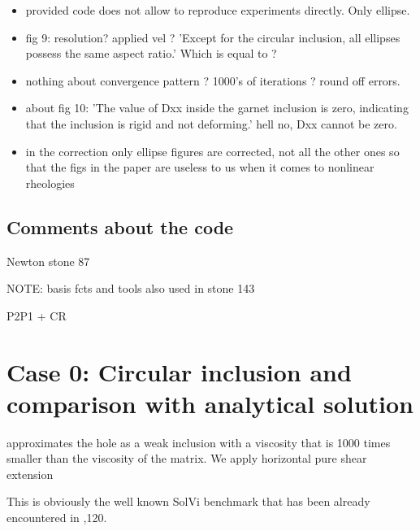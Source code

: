 \begin{itemize}
\item provided code does not allow to reproduce experiments directly. Only ellipse. 

\item fig 9: resolution? applied vel ? 'Except for the circular inclusion, all ellipses possess the same aspect ratio.' Which is equal to ?

\item nothing about convergence pattern ? 1000's of iterations ? round off errors.

\item about fig 10: 'The value of Dxx inside the garnet inclusion is zero, indicating that the inclusion is rigid and not deforming.' hell no, Dxx cannot be zero. 

\item in the correction only ellipse figures are corrected, not all the other ones so that the figs in the paper are useless to us when it comes to nonlinear rheologies

\end{itemize}



\subsection*{Comments about the code}

Newton stone 87

NOTE: basis fcts and tools also used in stone 143

P2P1 + CR 

\newpage
\section*{Case 0: Circular inclusion and comparison with analytical solution}


approximates the hole as a weak inclusion with a viscosity that is 1000 times smaller 
than the viscosity of the matrix.
We apply horizontal pure shear extension

This is obviously the well known SolVi benchmark that has been already 
encountered in ,120.

